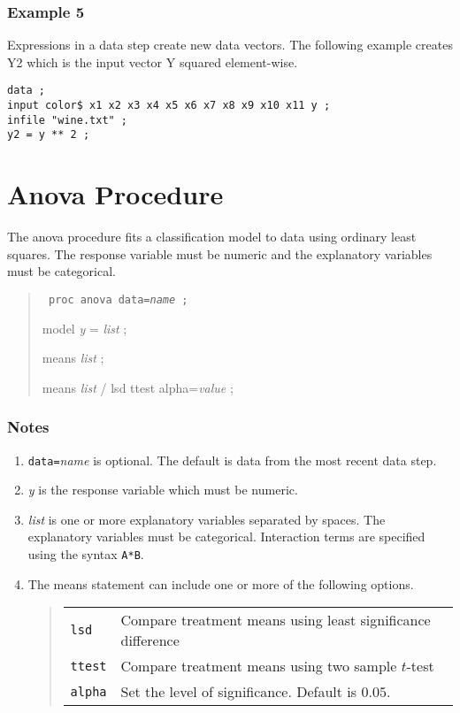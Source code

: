 \documentclass[12pt]{article}
\begin{document}
\subsubsection*{Example 5}

Expressions in a data step create new data vectors.
The following example creates Y2 which is the input
vector Y squared element-wise.

{\footnotesize\begin{verbatim}
data ;
input color$ x1 x2 x3 x4 x5 x6 x7 x8 x9 x10 x11 y ;
infile "wine.txt" ;
y2 = y ** 2 ;
\end{verbatim}}

\newpage

\section{Anova Procedure}

The anova procedure fits a classification model
to data using ordinary least squares.
The response variable must be numeric and the
explanatory variables must be categorical.

\begin{quote}
{\tt
proc anova data={\it name} ;

model {\it y} = {\it list} ;

means {\it list} ;

means {\it list} / lsd ttest alpha={\it value} ;
}
\end{quote}

\subsubsection*{Notes}

\begin{enumerate}
\item
{\tt data=}{\it name} is optional.
The default is data from the most recent data step.
\item
{\it y} is the response variable which must be numeric.
\item
{\it list} is one or more explanatory variables separated by spaces.
The explanatory variables must be categorical.
Interaction terms are specified using the syntax {\tt A*B}.
\item
The means statement can include one or more of the following options.
\begin{quote}
\begin{tabular}{ll}
{\tt lsd} & Compare treatment means using least significance difference \\
{\tt ttest} & Compare treatment means using two sample $t$-test \\
{\tt alpha} & Set the level of significance. Default is $0.05$.
\end{tabular}
\end{quote}
\end{enumerate}
\end{document}
